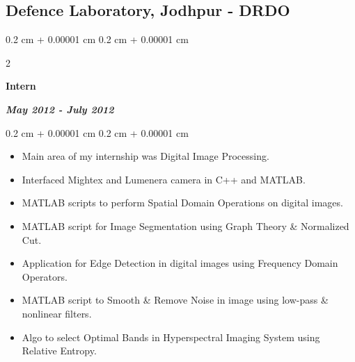 \documentclass[10pt, letterpaper]{article}
\newenvironment{highlights}{
    \begin{itemize}[
        topsep=0.10 cm,
        parsep=0.10 cm,
        partopsep=0pt,
        itemsep=0pt,
        leftmargin=0.4 cm + 10pt
    ]
}{
    \end{itemize}
} %
\newenvironment{onecolentry}{
    \begin{adjustwidth}{
        0.2 cm + 0.00001 cm
    }{
        0.2 cm + 0.00001 cm
    }
}{
    \end{adjustwidth}
} %
\newenvironment{twocolentry}[2][]{
    \onecolentry
    \def\secondColumn{#2}
    \setcolumnwidth{\fill, 6.0 cm}
    \begin{paracol}{2}
}{
    \switchcolumn \raggedleft \secondColumn
    \end{paracol}
    \endonecolentry
} %
\begin{document}
        \subsection{Defence Laboratory, Jodhpur - DRDO}
            \begin{twocolentry}{  
                \textit{\textbf{May 2012 - July 2012}}}
                \textbf{Intern}
            \end{twocolentry}

            \vspace{0.10 cm}
            
            \begin{onecolentry}
                \begin{highlights}
                    \item Main area of my internship was Digital Image Processing.
                    \item Interfaced Mightex and Lumenera camera in C++ and MATLAB.
                    \item MATLAB scripts to perform Spatial Domain Operations on digital images.
                    \item MATLAB script for Image Segmentation using Graph Theory \& Normalized Cut.
                    \item Application for Edge Detection in digital images using Frequency Domain Operators.
                    \item MATLAB script to Smooth \& Remove Noise in image using low-pass \& nonlinear filters.
                    \item Algo to select Optimal Bands in Hyperspectral Imaging System using Relative Entropy.
                \end{highlights}
            \end{onecolentry}
\end{document}
